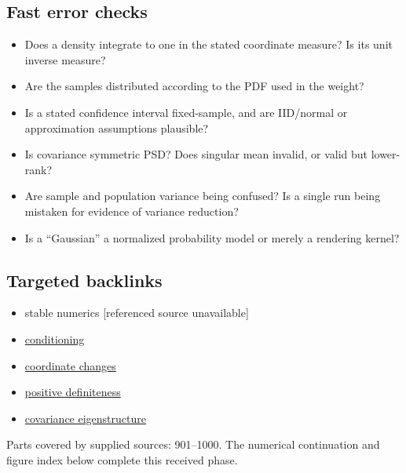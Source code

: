 \subsection{Fast error checks}\label{appendix-cb5af353ef77-fast-error-checks}

\begin{itemize}
\tightlist
\item
  Does a density integrate to one in the stated coordinate measure? Is its unit inverse measure?
\item
  Are the samples distributed according to the PDF used in the weight?
\item
  Is a stated confidence interval fixed-sample, and are IID/normal or approximation assumptions plausible?
\item
  Is covariance symmetric PSD? Does singular mean invalid, or valid but lower-rank?
\item
  Are sample and population variance being confused? Is a single run being mistaken for evidence of variance reduction?
\item
  Is a ``Gaussian'' a normalized probability model or merely a rendering kernel?
\end{itemize}

\subsection{Targeted backlinks}\label{appendix-cb5af353ef77-targeted-backlinks}

\begin{itemize}
\tightlist
\item
  {stable numerics {[}referenced source unavailable{]}}
\item
  \hyperref[01-foundations-i-ch018-an-inverse-can-exist-and-still-amplify-uncertainty]{conditioning}
\item
  \hyperref[01-foundations-i-ch019-coordinates-can-change-while-the-geometric-object-stays-still]{coordinate changes}
\item
  \hyperref[01-foundations-i-ch020-positive-definiteness-is-a-structural-promise]{positive definiteness}
\item
  \hyperref[01-foundations-i-ch020-diagonalization-leads-to-the-stronger-symmetric-spectral-theorem]{covariance eigenstructure}
\end{itemize}

Parts covered by supplied sources: 901--1000. The numerical continuation and figure index below complete this received phase.

